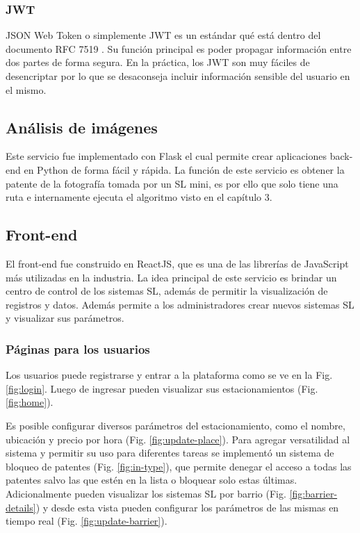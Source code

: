 \subsubsection{JWT}

JSON Web Token o simplemente JWT es un estándar qué está dentro del documento RFC 7519 \cite{jones_json_2015}. Su función principal es poder propagar información entre dos partes de forma segura. En la práctica, los JWT son muy fáciles de desencriptar por lo que se desaconseja incluir información sensible del usuario en el mismo.

\subsection{Análisis de imágenes}

Este servicio fue implementado con Flask el cual permite crear aplicaciones back-end en Python de forma fácil y rápida. La función de este servicio es obtener la patente de la fotografía tomada por un SL mini, es por ello que solo tiene una ruta e internamente ejecuta el algoritmo visto en el capítulo 3.

\subsection{Front-end}

El front-end fue construido en ReactJS, que es una de las librerías de JavaScript más utilizadas en la industria. La idea principal de este servicio es brindar un centro de control de los sistemas SL, además de permitir la visualización de registros y datos. Además permite a los administradores crear nuevos sistemas SL y visualizar sus parámetros.

\subsubsection{Páginas para los usuarios}

Los usuarios puede registrarse y entrar a la plataforma como se ve en la Fig. \ref{fig:login}. Luego de ingresar pueden visualizar sus estacionamientos (Fig. \ref{fig:home}).

Es posible configurar diversos parámetros del estacionamiento, como el nombre, ubicación y precio por hora (Fig. \ref{fig:update-place}).
Para agregar versatilidad al sistema y permitir su uso para diferentes tareas se implementó un sistema de bloqueo de patentes (Fig. \ref{fig:in-type}), que permite denegar el acceso a  todas las patentes salvo las que estén en la lista o bloquear solo estas últimas. Adicionalmente pueden visualizar los sistemas SL por barrio (Fig. \ref{fig:barrier-details}) y desde esta vista pueden configurar los parámetros de las mismas en tiempo real (Fig. \ref{fig:update-barrier}).

